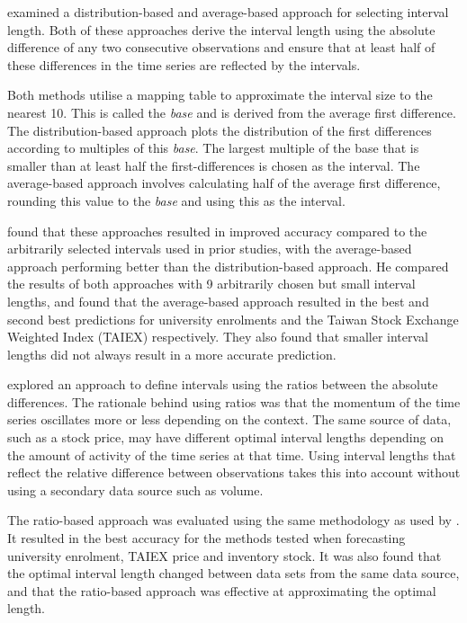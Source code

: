 \documentclass[12pt, oneside, a4paper]{article}
\theoremstyle{definition}
\begin{document}
\cite{Huarng2001effective} examined a distribution-based and average-based approach for selecting interval length. Both of these approaches derive the interval length using the absolute difference of any two consecutive observations and ensure that at least half of these differences in the time series are reflected by the intervals. 

Both methods utilise a mapping table to approximate the interval size to the nearest 10. This is called the \textit{base} and is derived from the average first difference. The distribution-based approach plots the distribution of the first differences according to multiples of this \textit{base}. The largest multiple of the base that is smaller than at least half the first-differences is chosen as the interval. The average-based approach involves calculating half of the average first difference, rounding this value to the \textit{base} and using this as the interval.

\cite{Huarng2001effective} found that these approaches resulted in improved accuracy compared to the arbitrarily selected intervals used in prior studies, with the average-based approach performing better than the distribution-based approach. He compared the results of both approaches with 9 arbitrarily chosen but small interval lengths, and found that the average-based approach resulted in the best and second best predictions for university enrolments and the Taiwan Stock Exchange Weighted Index (TAIEX) respectively. They also found that smaller interval lengths did not always result in a more accurate prediction.

\cite{huarng2006ratio} explored an approach to define intervals using the ratios between the absolute differences. The rationale behind using ratios was that the momentum of the time series oscillates more or less depending on the context. The same source of data, such as a stock price, may have different optimal interval lengths depending on the amount of activity of the time series at that time. Using interval lengths that reflect the relative difference between observations takes this into account without using a secondary data source such as volume.

The ratio-based approach was evaluated using the same methodology as used by \cite{Huarng2001effective}. It resulted in the best accuracy for the methods tested when forecasting university enrolment, TAIEX price and inventory stock. It was also found that the optimal interval length changed between data sets from the same data source, and that the ratio-based approach was effective at approximating the optimal length.
\end{document}
